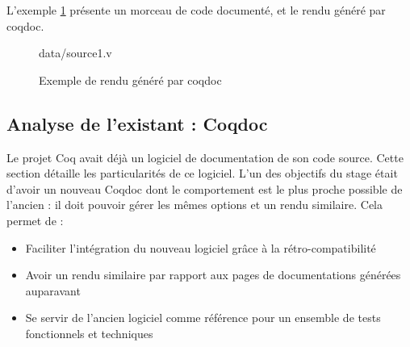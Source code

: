 \documentclass[a4paper, 11pt]{report}
\begin{document}
    L'exemple \ref{fig1} présente un morceau de code documenté, et le rendu
    généré par coqdoc.

    \begin{figure}
      
        {data/source1.v}
      \caption{Exemple de rendu généré par coqdoc}
      \label{fig1}
    \end{figure}

    \clearpage

    \subsection{Analyse de l'existant : Coqdoc}
    Le projet Coq avait déjà un logiciel de documentation de son code source.
    Cette section détaille les particularités de ce logiciel. L'un des objectifs
    du stage était d'avoir un nouveau Coqdoc dont le comportement est le plus
    proche possible de l'ancien : il doit pouvoir gérer les mêmes options et
    un rendu similaire. Cela permet de :
    \begin{itemize}
      \item Faciliter l'intégration du nouveau logiciel grâce à la
        rétro-compatibilité
      \item Avoir un rendu similaire par rapport aux pages de documentations
        générées auparavant
      \item Se servir de l'ancien logiciel comme référence pour un ensemble
        de tests fonctionnels et techniques
    \end{itemize}
\end{document}
